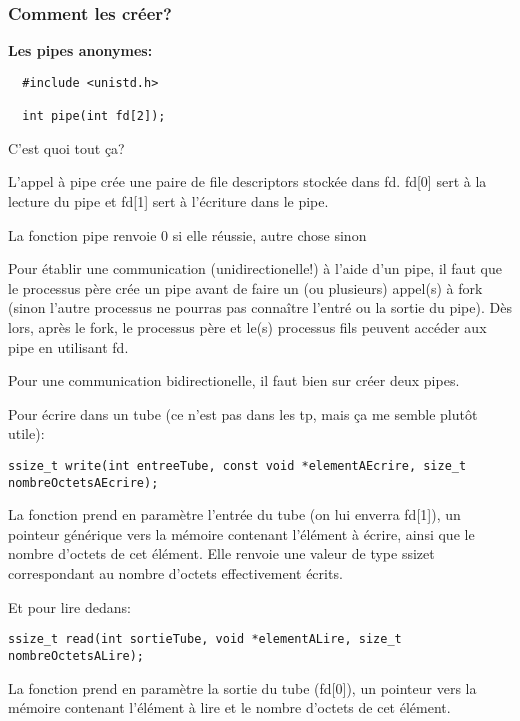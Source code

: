 \documentclass[a4paper]{article}
\begin{document}
\subsubsection{Comment les créer?}
\textbf{Les pipes anonymes:}
\begin{lstlisting}
  #include <unistd.h>

  int pipe(int fd[2]);
\end{lstlisting}
C'est quoi tout ça?\newline
\begin{description}
  \item L’appel à pipe crée une paire de \guillemotleft{}file descriptors\guillemotright{} stockée dans fd.\newline
           fd[0] sert à la lecture du pipe et fd[1] sert à l’écriture dans le pipe.
  \item La fonction pipe renvoie 0 si elle réussie, autre chose sinon
  \item Pour établir une communication (unidirectionelle!) à l’aide d’un pipe, il faut que le processus père crée un pipe avant de faire un (ou plusieurs) appel(s) à fork (sinon l'autre processus ne pourras pas connaître l'entré ou la sortie du pipe). Dès lors, après le fork, le processus père et le(s) processus fils peuvent accéder aux pipe en utilisant fd.
  \item Pour une communication bidirectionelle, il faut bien sur créer deux pipes.
\end{description}
Pour écrire dans un tube (ce n'est pas dans les tp, mais ça me semble plutôt utile):
\begin{lstlisting}
ssize_t write(int entreeTube, const void *elementAEcrire, size_t nombreOctetsAEcrire);
\end{lstlisting}
La fonction prend en paramètre l'entrée du tube (on lui enverra fd[1]), un pointeur générique vers la mémoire contenant l'élément à écrire, ainsi que le nombre d'octets de cet élément.\newline
Elle renvoie une valeur de type ssize\textunderscore{}t correspondant au nombre d'octets effectivement écrits.\par
Et pour lire dedans:
\begin{lstlisting}
ssize_t read(int sortieTube, void *elementALire, size_t nombreOctetsALire);
\end{lstlisting}
La fonction prend en paramètre la sortie du tube (fd[0]), un pointeur vers la mémoire contenant l'élément à lire et le nombre d'octets de cet élément.\newline
\end{document}
